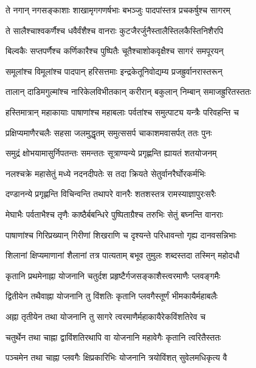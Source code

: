 \twolineshloka
{ते नगान् नगसङ्काशाः शाखामृगगणर्षभाः}
{बभञ्जुः पादपांस्तत्र प्रचकर्षुश्च सागरम्} %

\twolineshloka
{ते सालैश्चाश्वकर्णैश्च धवैर्वंशैश्च वानराः}
{कुटजैरर्जुनैस्तालैस्तिलकैस्तिनिशैरपि} %

\twolineshloka
{बिल्वकैः सप्तपर्णैश्च कर्णिकारैश्च पुष्पितैः}
{चूतैश्चाशोकवृक्षैश्च सागरं समपूरयन्} %

\twolineshloka
{समूलांश्च विमूलांश्च पादपान् हरिसत्तमाः}
{इन्द्रकेतूनिवोद्यम्य प्रजह्रुर्वानरास्तरून्} %

\twolineshloka
{तालान् दाडिमगुल्मांश्च नारिकेलविभीतकान्}
{करीरान् बकुलान् निम्बान् समाजह्रुरितस्ततः} %

\twolineshloka
{हस्तिमात्रान् महाकायाः पाषाणांश्च महाबलाः}
{पर्वतांश्च समुत्पाट्य यन्त्रैः परिवहन्ति च} %

\twolineshloka
{प्रक्षिप्यमाणैरचलैः सहसा जलमुद्धृतम्}
{समुत्ससर्प चाकाशमवासर्पत् ततः पुनः} %

\twolineshloka
{समुद्रं क्षोभयामासुर्निपतन्तः समन्ततः}
{सूत्राण्यन्ये प्रगृह्णन्ति ह्यायतं शतयोजनम्} %

\twolineshloka
{नलश्चक्रे महासेतुं मध्ये नदनदीपतेः}
{स तदा क्रियते सेतुर्वानरैर्घोरकर्मभिः} %

\twolineshloka
{दण्डानन्ये प्रगृह्णन्ति विचिन्वन्ति तथापरे}
{वानरैः शतशस्तत्र रामस्याज्ञापुरःसरैः} %

\twolineshloka
{मेघाभैः पर्वताभैश्च तृणैः काष्ठैर्बबन्धिरे}
{पुष्पिताग्रैश्च तरुभिः सेतुं बघ्नन्ति वानराः} %

\twolineshloka
{पाषाणांश्च गिरिप्रख्यान् गिरीणां शिखराणि च}
{दृश्यन्ते परिधावन्तो गृह्य दानवसन्निभाः} %

\twolineshloka
{शिलानां क्षिप्यमाणानां शैलानां तत्र पात्यताम्}
{बभूव तुमुलः शब्दस्तदा तस्मिन् महोदधौ} %

\twolineshloka
{कृतानि प्रथमेनाह्ना योजनानि चतुर्दश}
{प्रहृष्टैर्गजसङ्काशैस्त्वरमाणैः प्लवङ्गमैः} %

\twolineshloka
{द्वितीयेन तथैवाह्ना योजनानि तु विंशतिः}
{कृतानि प्लवगैस्तूर्णं भीमकायैर्महाबलैः} %

\twolineshloka
{अह्ना तृतीयेन तथा योजनानि तु सागरे}
{त्वरमाणैर्महाकायैरेकविंशतिरेव च} %

\twolineshloka
{चतुर्थेन तथा चाह्ना द्वाविंशतिरथापि वा}
{योजनानि महावेगैः कृतानि त्वरितैस्ततः} %

\twolineshloka
{पञ्चमेन तथा चाह्ना प्लवगैः क्षिप्रकारिभिः}
{योजनानि त्रयोविंशत् सुवेलमधिकृत्य वै} %

